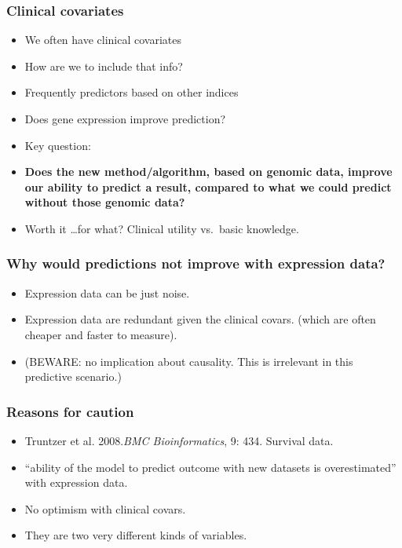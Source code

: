 


\begin{frame}[label = covars]
\frametitle{Clinical covariates}
\begin{itemize}
\item We often have clinical covariates
\item How are we to include that info?
\item Frequently predictors based on other indices
\item Does gene expression improve prediction?
\item Key question: 
\item \textbf{Does the new method/algorithm, based on genomic data,
    improve our ability to predict a result, compared to what we could
    predict without those genomic data?}
\item Worth it \ldots for what? Clinical utility vs.\ basic knowledge.
\end{itemize}
\end{frame}


\begin{frame}
\frametitle{Why would predictions not improve with expression data?}
\begin{itemize}
\item Expression data can be just noise.
\item Expression data are redundant given the clinical covars. (which are
  often cheaper and faster to measure).
\item (BEWARE: no implication about causality. This is irrelevant in this
  predictive scenario.) 
\end{itemize}
\end{frame}


\begin{frame}
\frametitle{Reasons for caution}
\begin{itemize}
\item Truntzer et al. 2008.\textit{BMC Bioinformatics}, 9: 434. Survival
  data.
\item ``ability of the model to predict outcome with
  new datasets is overestimated'' with expression data. 
\item No optimism with clinical covars.
\item They are two very different kinds of variables.
\end{itemize}
\end{frame}


